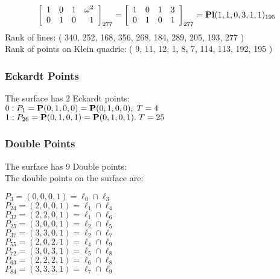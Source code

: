 \documentclass{article}
\newcommand{\bP}{{\bf P}}
\begin{document}
{$$\left[
\begin{array}{*{4}{r}}
1 & 0 & 1 & \omega^{2}\\
0 & 1 & 0 & 1\\
\end{array}
\right]
_{277}
=
\left[
\begin{array}{*{4}c}
1  & 0  & 1  & 3\\
0  & 1  & 0  & 1\\
\end{array}
\right]_{277}
={\rm\bf Pl}(1,1,0,3,1,1 )_{195}$$
Rank of lines: ( 340, 252, 168, 356, 268, 184, 289, 205, 193, 277 )\\
Rank of points on Klein quadric: ( 9, 11, 12, 1, 8, 7, 114, 113, 192, 195 )\\
\subsubsection*{Eckardt Points}
The surface has 2 Eckardt points:\\
$0 : P_{1}=\bP(0, 1, 0, 0) = \bP(0, 1, 0, 0),\; T= 4$\\
$1 : P_{26}=\bP(0, 1, 0, 1) = \bP(0, 1, 0, 1).\; T= 25$\\
\subsubsection*{Double Points}
The surface has 9 Double points:\\
The double points on the surface are:\\
\begin{multicols}{2}
\noindent
$P_{3} = ( 0, 0, 0, 1 ) = \ell_{0} \cap \ell_{3} $\\
$P_{24} = ( 2, 0, 0, 1 ) = \ell_{1} \cap \ell_{4} $\\
$P_{32} = ( 2, 2, 0, 1 ) = \ell_{1} \cap \ell_{6} $\\
$P_{25} = ( 3, 0, 0, 1 ) = \ell_{2} \cap \ell_{5} $\\
$P_{37} = ( 3, 3, 0, 1 ) = \ell_{2} \cap \ell_{7} $\\
$P_{55} = ( 2, 0, 2, 1 ) = \ell_{4} \cap \ell_{9} $\\
$P_{72} = ( 3, 0, 3, 1 ) = \ell_{5} \cap \ell_{8} $\\
$P_{63} = ( 2, 2, 2, 1 ) = \ell_{6} \cap \ell_{8} $\\
$P_{84} = ( 3, 3, 3, 1 ) = \ell_{7} \cap \ell_{9} $\\
\end{multicols}
}
\end{document}
